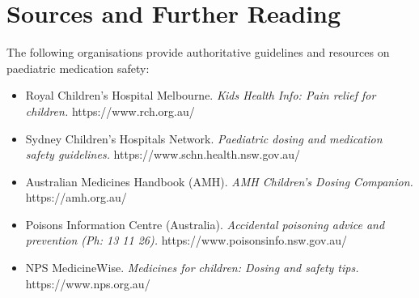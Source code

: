 \section*{Sources and Further Reading}
The following organisations provide authoritative guidelines and resources on paediatric medication safety:
\begin{itemize}
    \item Royal Children's Hospital Melbourne. \textit{Kids Health Info: Pain relief for children.} https://www.rch.org.au/
    \item Sydney Children's Hospitals Network. \textit{Paediatric dosing and medication safety guidelines.} https://www.schn.health.nsw.gov.au/
    \item Australian Medicines Handbook (AMH). \textit{AMH Children's Dosing Companion.} https://amh.org.au/
    \item Poisons Information Centre (Australia). \textit{Accidental poisoning advice and prevention (Ph: 13 11 26).} https://www.poisonsinfo.nsw.gov.au/
    \item NPS MedicineWise. \textit{Medicines for children: Dosing and safety tips.} https://www.nps.org.au/
\end{itemize}
